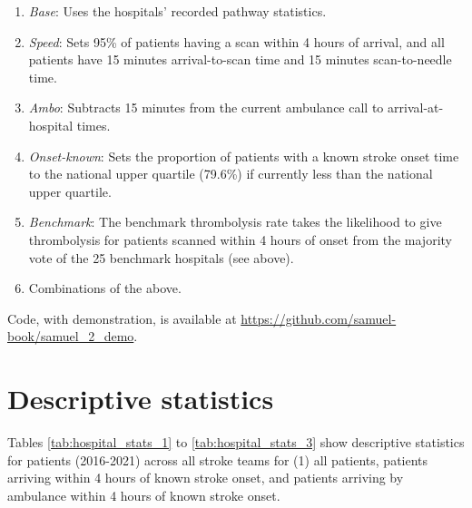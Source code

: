 \begin{enumerate}

    \item \textit{Base}: Uses the hospitals’ recorded pathway statistics.

    \item \textit{Speed}: Sets 95\% of patients having a scan within 4 hours of arrival, and all patients have 15 minutes arrival-to-scan time and 15 minutes scan-to-needle time.

    \item \textit{Ambo}: Subtracts 15 minutes from the current ambulance call to arrival-at-hospital times.

    \item  \textit{Onset-known}: Sets the proportion of patients with a known stroke onset time to the national upper quartile (79.6\%) if currently less than the national upper quartile.

    \item \textit{Benchmark}: The benchmark thrombolysis rate takes the likelihood to give thrombolysis for patients scanned within 4 hours of onset from the majority vote of the 25 benchmark hospitals (see above).

    \item Combinations of the above.
    
\end{enumerate}

Code, with demonstration, is available at \url{https://github.com/samuel-book/samuel_2_demo}.
















\section{Descriptive statistics}
\label{sec:stats}

Tables \ref{tab:hospital_stats_1} to \ref{tab:hospital_stats_3} show descriptive statistics for patients (2016-2021) across all stroke teams for (1) all patients, patients arriving within 4 hours of known stroke onset, and patients arriving by ambulance within 4 hours of known stroke onset.

